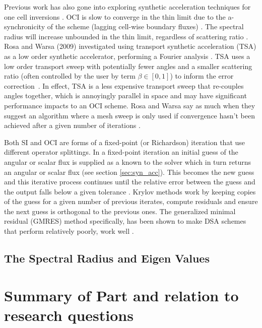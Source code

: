 Previous work has also gone into exploring synthetic acceleration techniques for one cell inversions \cite{ kim_coarse_2000}.
OCI is slow to converge in the thin limit due to the a-synchronicity of the scheme (lagging cell-wise boundary fluxes) \cite{hoagland_hybrid_2021}.
The spectral radius will increase unbounded in the thin limit, regardless of scattering ratio \cite{rosa_cellwise_2013}.
Rosa and Warsa (2009) investigated using transport synthetic acceleration (TSA) as a low order synthetic accelerator, performing a Fourier analysis \cite{tsa2009rosa, tsa_slab2006rosa, tsa_2d2007rosa}.
TSA uses a low order transport sweep with potentially fewer angles and a smaller scattering ratio (often controlled by the user by term $\beta \in [0,1]$) to inform the error correction~\cite{tsa1997gilles}.
In effect, TSA is a less expensive transport sweep that re-couples angles together, which is annoyingly parallel in space and may have significant performance impacts to an OCI scheme.
Rosa and Warsa say as much when they suggest an algorithm where a mesh sweep is only used if convergence hasn't been achieved after a given number of iterations \cite{tsa2009rosa}.

Both SI and OCI are forms of a fixed-point (or Richardson) iteration that use different operator splittings.
In a fixed-point iteration an initial guess of the angular or scalar flux is supplied as a known to the solver which in turn returns an angular or scalar flux (see section \ref{sec:syn_acc}).
This becomes the new guess and this iterative process continues until the relative error between the guess and the output falls below a given tolerance \cite{lewis_computational_1984}.
Krylov methods work by keeping copies of the guess for a given number of previous iterates, compute residuals and ensure the next guess is orthogonal to the previous ones\cite{gmres1996kelley, patton_gmres_2002}.
The generalized minimal residual (GMRES) method specifically, has been shown to make DSA schemes that perform relatively poorly, work well \cite{kylov2004warsa, subspace2004warsa}.


\subsection{The Spectral Radius and Eigen Values}


\section{Summary of Part and relation to research questions}


